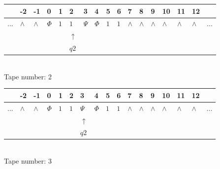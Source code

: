 \documentclass[11pt]{article}
\begin{document}
\begin{table}[H]
\centering
\begin{tabular}{lllllllllllllllll}
 & -2 & -1 & 0 & 1 & 2 & 3 & 4 & 5 & 6 & 7 & 8 & 9 & 10 & 11 & 12 & \\
\hline
$...$ & \multicolumn{1}{|l|}{$\wedge$} & \multicolumn{1}{|l|}{$\wedge$} & \multicolumn{1}{|l|}{$\Phi$} & \multicolumn{1}{|l|}{$1$} & \multicolumn{1}{|l|}{$1$} & \multicolumn{1}{|l|}{$\Psi$} & \multicolumn{1}{|l|}{$\Phi$} & \multicolumn{1}{|l|}{$1$} & \multicolumn{1}{|l|}{$1$} & \multicolumn{1}{|l|}{$\wedge$} & \multicolumn{1}{|l|}{$\wedge$} & \multicolumn{1}{|l|}{$\wedge$} & \multicolumn{1}{|l|}{$\wedge$} & \multicolumn{1}{|l|}{$\wedge$} & \multicolumn{1}{|l|}{$\wedge$} & $...$\\
\hline
&  &  &  &  & $\uparrow$ &  &  &  &  &  &  &  &  &  &  &  \\
&  &  &  &  & $ q2 $ &  &  &  &  &  &  &  &  &  &  &  \\
\end{tabular}
\\
Tape number: 2
\noindent\makebox[\linewidth]{\hdashrule{\textwidth}{1pt}{1pt}}\end{table}

\begin{table}[H]
\centering
\begin{tabular}{lllllllllllllllll}
 & -2 & -1 & 0 & 1 & 2 & 3 & 4 & 5 & 6 & 7 & 8 & 9 & 10 & 11 & 12 & \\
\hline
$...$ & \multicolumn{1}{|l|}{$\wedge$} & \multicolumn{1}{|l|}{$\wedge$} & \multicolumn{1}{|l|}{$\Phi$} & \multicolumn{1}{|l|}{$1$} & \multicolumn{1}{|l|}{$1$} & \multicolumn{1}{|l|}{$\Psi$} & \multicolumn{1}{|l|}{$\Phi$} & \multicolumn{1}{|l|}{$1$} & \multicolumn{1}{|l|}{$1$} & \multicolumn{1}{|l|}{$\wedge$} & \multicolumn{1}{|l|}{$\wedge$} & \multicolumn{1}{|l|}{$\wedge$} & \multicolumn{1}{|l|}{$\wedge$} & \multicolumn{1}{|l|}{$\wedge$} & \multicolumn{1}{|l|}{$\wedge$} & $...$\\
\hline
&  &  &  &  &  & $\uparrow$ &  &  &  &  &  &  &  &  &  &  \\
&  &  &  &  &  & $ q2 $ &  &  &  &  &  &  &  &  &  &  \\
\end{tabular}
\\
Tape number: 3
\noindent\makebox[\linewidth]{\hdashrule{\textwidth}{1pt}{1pt}}\end{table}
\end{document}
